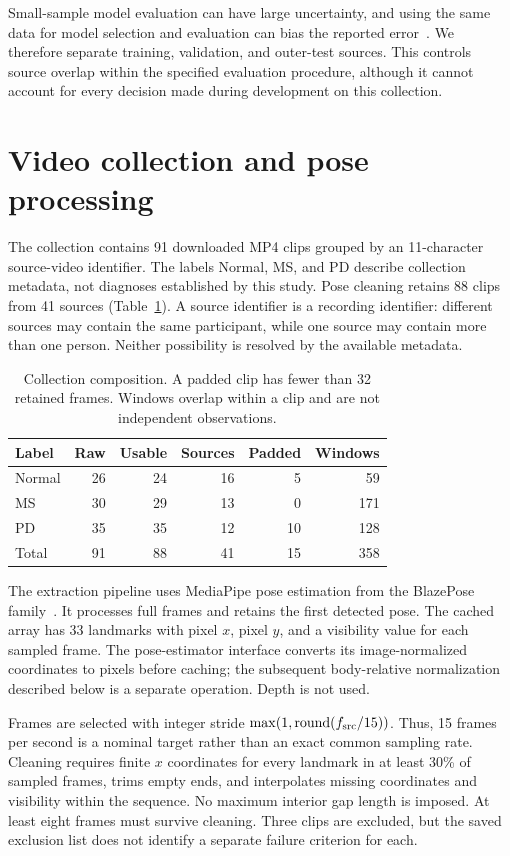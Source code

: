 \documentclass[10pt,twocolumn,letterpaper]{article}
\begin{document}
Small-sample model evaluation can have large uncertainty, and using the same data for model selection and evaluation can bias the reported error~\cite{varoquaux2018,varma2006}. We therefore separate training, validation, and outer-test sources. This controls source overlap within the specified evaluation procedure, although it cannot account for every decision made during development on this collection.

\section{Video collection and pose processing}
The collection contains 91 downloaded MP4 clips grouped by an 11-character source-video identifier. The labels Normal, MS, and PD describe collection metadata, not diagnoses established by this study. Pose cleaning retains 88 clips from 41 sources (Table~\ref{tab:data}). A source identifier is a recording identifier: different sources may contain the same participant, while one source may contain more than one person. Neither possibility is resolved by the available metadata.

\begin{table}[t]
\centering
\caption{Collection composition. A padded clip has fewer than 32 retained frames. Windows overlap within a clip and are not independent observations.}
\label{tab:data}
\small
\setlength{\tabcolsep}{4pt}
\begin{tabular}{lrrrrr}
\toprule
Label & Raw & Usable & Sources & Padded & Windows\\
\midrule
Normal &26&24&16&5&59\\
MS &30&29&13&0&171\\
PD &35&35&12&10&128\\
\midrule
Total &91&88&41&15&358\\
\bottomrule
\end{tabular}
\end{table}

The extraction pipeline uses MediaPipe pose estimation from the BlazePose family~\cite{blazepose}. It processes full frames and retains the first detected pose. The cached array has 33 landmarks with pixel $x$, pixel $y$, and a visibility value for each sampled frame. The pose-estimator interface converts its image-normalized coordinates to pixels before caching; the subsequent body-relative normalization described below is a separate operation. Depth is not used.

Frames are selected with integer stride $\max(1,\operatorname{round}(f_{\rm src}/15))$. Thus, 15 frames per second is a nominal target rather than an exact common sampling rate. Cleaning requires finite $x$ coordinates for every landmark in at least 30\% of sampled frames, trims empty ends, and interpolates missing coordinates and visibility within the sequence. No maximum interior gap length is imposed. At least eight frames must survive cleaning. Three clips are excluded, but the saved exclusion list does not identify a separate failure criterion for each.
\end{document}

